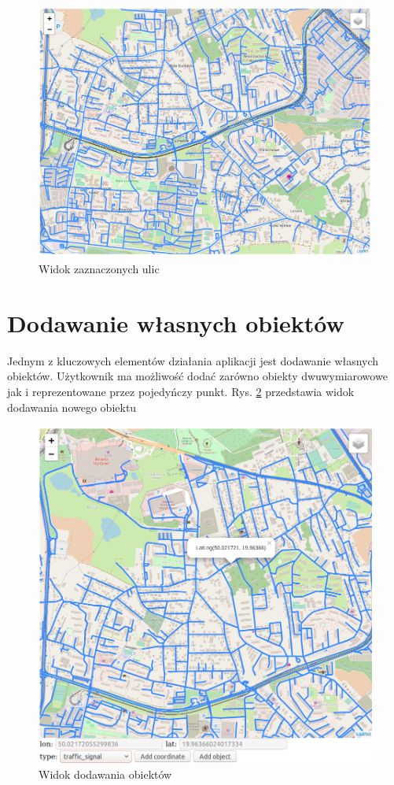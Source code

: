 \begin{figure}[h]
\caption{Widok zaznaczonych ulic}
\label{sec:onlyStreetMap}
\centering
\includegraphics[width=1.03\textwidth]{onlyStreet}
\end{figure}

\newpage
\section{Dodawanie własnych obiektów}
\label{sec:addedCustomObjects}

Jednym z kluczowych elementów działania aplikacji jest dodawanie własnych obiektów. Użytkownik ma możliwość dodać zarówno obiekty dwuwymiarowowe jak i reprezentowane przez pojedyńczy punkt. Rys. \ref{sec:addObject} przedstawia widok dodawania nowego obiektu

\begin{figure}[h]
\caption{Widok dodawania obiektów}
\label{sec:addObject}
\centering
\includegraphics[width=1.07\textwidth]{addObject}
\end{figure}

